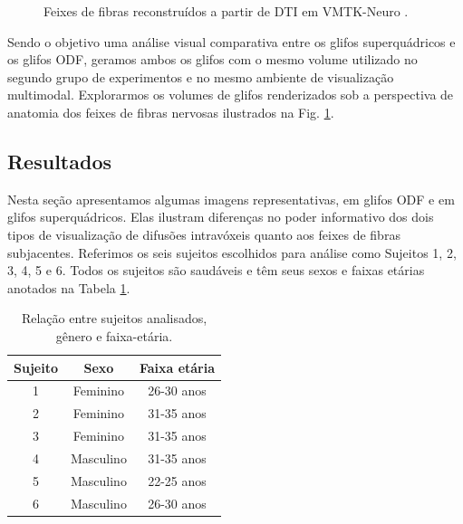 \begin{figure}[H]
{    \label{fig::tratos_4}
    }
    \caption{Feixes de fibras reconstruídos a partir de DTI em VMTK-Neuro \cite{VMTKNeuro}.}
    \label{fig::tratos}
\end{figure}




Sendo o objetivo uma análise visual comparativa entre os glifos superquádricos \cite{Kindlmann2004} e os glifos ODF, geramos ambos os glifos com o mesmo volume utilizado no segundo grupo de experimentos e no mesmo ambiente de visualização multimodal.
Explorarmos os volumes de glifos renderizados sob a perspectiva de anatomia dos feixes de fibras nervosas ilustrados na Fig. \ref{fig::tratos}.


\subsection{Resultados}
\label{ssec::visual_resultados}

Nesta seção apresentamos algumas imagens representativas, em glifos ODF e em glifos superquádricos. Elas ilustram diferenças no poder informativo dos dois tipos de visualização de difusões intravóxeis quanto aos feixes de fibras subjacentes. Referimos os seis sujeitos escolhidos para análise como Sujeitos 1, 2, 3, 4, 5 e 6. Todos os sujeitos são saudáveis e têm seus sexos e faixas etárias anotados na Tabela \ref{tab::vol_id}.

\begin{table}[htb]
\centering
\begin{tabular}{|c|c|c|}
\hline
\textbf{Sujeito} & \textbf{Sexo} & \textbf{Faixa etária} \\ \hline
1                & Feminino      & 26-30 anos            \\ \hline
2                & Feminino      & 31-35 anos            \\ \hline
3                & Feminino      & 31-35 anos            \\ \hline
4                & Masculino     & 31-35 anos            \\ \hline
5                & Masculino     & 22-25 anos            \\ \hline
6                & Masculino     & 26-30 anos            \\ \hline
\end{tabular}
\caption{Relação entre sujeitos analisados, gênero e faixa-etária.}
\label{tab::vol_id}
\end{table}

